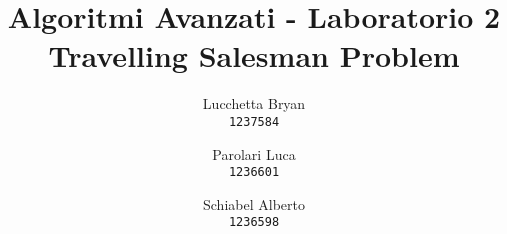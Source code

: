 \author{
  Lucchetta Bryan\\
  \texttt{1237584}
  \and
  Parolari Luca\\
  \texttt{1236601}
  \and
  Schiabel Alberto\\
  \texttt{1236598}
}

\title{Algoritmi Avanzati - Laboratorio 2 \\
  \large Travelling Salesman Problem}

\maketitle

\setcounter{tocdepth}{2}
{
  \hypersetup{linkcolor=black}
  \tableofcontents
  \newpage
  \listoffigures
  \listoftables
}
\protect\pagebreak[2]

